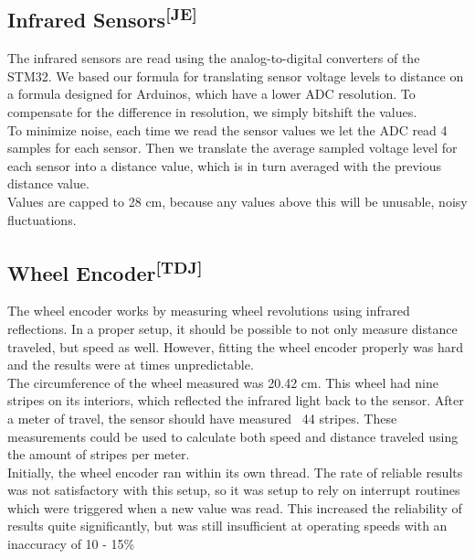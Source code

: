 \subsection[Infrared Sensors]{Infrared Sensors\textsuperscript{[JE]}}
The infrared sensors are read using the analog-to-digital converters of the
STM32. We based our formula for translating sensor voltage levels to distance on
a formula designed for Arduinos, which have a lower ADC resolution. To
compensate for the difference in resolution, we simply bitshift the values.\\

\noindent
To minimize noise, each time we read the sensor values we let the ADC read 4
samples for each sensor. Then we translate the average sampled voltage level for
each sensor into a distance value, which is in turn averaged with the previous
distance value.\\

\noindent
Values are capped to 28 cm, because any values above this will be unusable,
noisy fluctuations.

\subsection[Wheel Encoder]{Wheel Encoder\textsuperscript{[TDJ]}}
The wheel encoder works by measuring wheel revolutions using infrared
reflections. In a proper setup, it should be possible to not only measure
distance traveled, but speed as well. However, fitting the wheel encoder
properly was hard and the results were at times unpredictable.\\

\noindent
The circumference of the wheel measured was 20.42 cm. This wheel had nine
stripes on its interiors, which reflected the infrared light back to the sensor.
After a meter of travel, the sensor should have measured ~44 stripes. These
measurements could be used to calculate both speed and distance traveled using
the amount of stripes per meter.\\

\noindent
Initially, the wheel encoder ran within its own thread. The rate of reliable
results was not satisfactory with this setup, so it was setup to rely on
interrupt routines which were triggered when a new value was read. This
increased the reliability of results quite significantly, but was still
insufficient at operating speeds with an inaccuracy of 10 - 15\%\\

